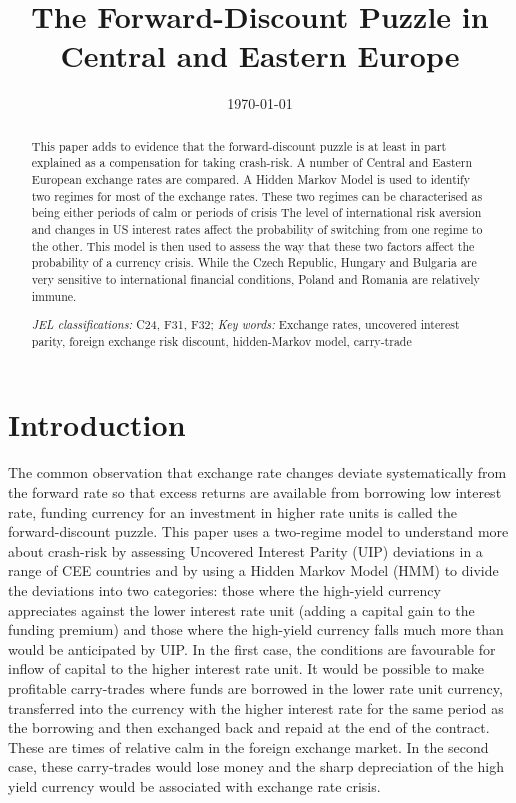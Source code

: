 \documentclass[12pt, a4paper, oneside]{article}\usepackage[]{graphicx}\usepackage[]{color}
\begin{document}
\title{The Forward-Discount Puzzle in Central and Eastern Europe}
\date{\today}
\maketitle
\begin{abstract}
This paper adds to evidence that the forward-discount puzzle is at least in part explained as a compensation for taking crash-risk. A number of Central and Eastern European exchange rates are compared. A Hidden Markov Model is used to identify two regimes for most of the exchange rates.  These two regimes can be characterised as being either periods of calm or periods of crisis The level of international risk aversion and changes in US interest rates affect the probability of switching from one regime to the other. This model is then used to assess the way that these two factors affect the probability of a currency crisis. While the Czech Republic,  Hungary and Bulgaria are very sensitive to international financial conditions, Poland and Romania are relatively immune.  

\emph{JEL classifications:} C24, F31, F32; 
\emph{Key words:} Exchange rates, uncovered interest parity, foreign exchange risk discount, hidden-Markov model, carry-trade


\end{abstract}

\section{Introduction}
The common observation that exchange rate changes deviate systematically from the forward rate so that excess returns are available from borrowing low interest rate, funding currency for an investment in higher rate units is called the forward-discount puzzle.   This paper uses a two-regime model to understand more about crash-risk by assessing Uncovered Interest Parity (UIP) deviations in a range of CEE countries and by using a Hidden Markov Model (HMM) to divide the deviations into two categories: those where the high-yield currency appreciates against the lower interest rate unit (adding a capital gain to the funding premium)  and those where the high-yield currency falls much more than would be anticipated by UIP.  In the first case, the conditions are favourable for inflow of capital to the higher interest rate unit.  It would be possible to make profitable carry-trades where funds are borrowed in the lower rate unit currency, transferred into the currency with the higher interest rate for the same period as the borrowing and then exchanged back and repaid at the end of the contract. These are times of relative calm in the foreign exchange market. In the second case, these carry-trades would lose money and the sharp depreciation of the high yield currency would be associated with exchange rate crisis. 
\end{document}
